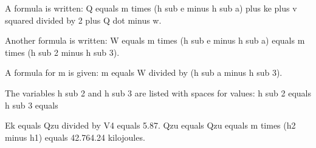 A formula is written: 
Q equals m times (h sub e minus h sub a) plus ke plus v squared divided by 2 plus Q dot minus w.

Another formula is written: 
W equals m times (h sub e minus h sub a) equals m times (h sub 2 minus h sub 3).

A formula for m is given: 
m equals W divided by (h sub a minus h sub 3).

The variables h sub 2 and h sub 3 are listed with spaces for values:
h sub 2 equals 
h sub 3 equals

Ek equals Qzu divided by V4 equals 5.87. Qzu equals Qzu equals m times (h2 minus h1) equals 42.764.24 kilojoules.
